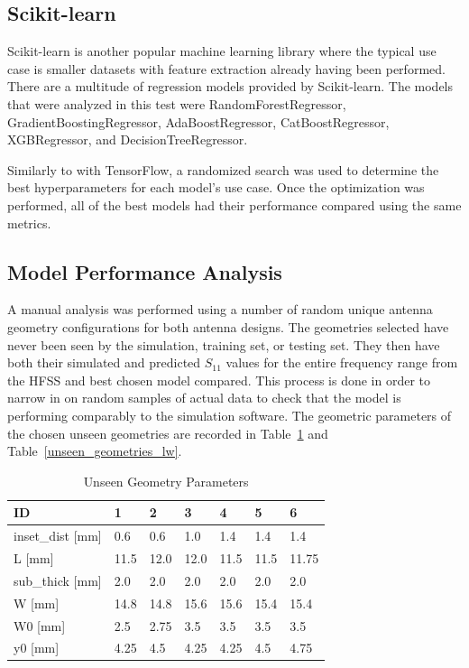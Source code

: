 \documentclass[conference]{IEEEtran}
\begin{document}
\subsection{Scikit-learn}
Scikit-learn is another popular machine learning library where the typical use case is smaller datasets with feature extraction already having been performed. There are a multitude of regression models provided by Scikit-learn. The models that were analyzed in this test were RandomForestRegressor, GradientBoostingRegressor, AdaBoostRegressor, CatBoostRegressor, XGBRegressor, and DecisionTreeRegressor.

Similarly to with TensorFlow, a randomized search was used to determine the best hyperparameters for each model's use case. Once the optimization was performed, all of the best models had their performance compared using the same metrics. 

\subsection{Model Performance Analysis}
A manual analysis was performed using a number of random unique antenna geometry configurations for both antenna designs. The geometries selected have never been seen by the simulation, training set, or testing set. They then have both their simulated and predicted $S_{11}$ values for the entire frequency range from the HFSS and best chosen model compared. This process is done in order to narrow in on random samples of actual data to check that the model is performing comparably to the simulation software. The geometric parameters of the chosen unseen geometries are recorded in Table~\ref{unseen_geometries_p} and Table~\ref{unseen_geometries_lw}.

\begin{table}[h]
\caption{Unseen Geometry Parameters}
\begin{center}
\begin{tabular}{ |l|l|l|l|l|l|l| }
    \hline
    ID & 1 & 2 & 3 & 4 & 5 & 6 \\ 
    \hline
    inset\_dist [mm] & 0.6 & 0.6 & 1.0 & 1.4 & 1.4 & 1.4 \\
    \hline
    L [mm] & 11.5 & 12.0 & 12.0 & 11.5 & 11.5 & 11.75 \\
    \hline
    sub\_thick [mm]  & 2.0 & 2.0 & 2.0 & 2.0 & 2.0 & 2.0 \\
    \hline
    W [mm]  & 14.8 & 14.8 & 15.6 & 15.6 & 15.4 & 15.4 \\
    \hline
    W0 [mm] & 2.5 & 2.75 & 3.5 & 3.5 & 3.5 & 3.5 \\
    \hline
    y0 [mm] & 4.25 & 4.5 & 4.25 & 4.25 & 4.5 & 4.75 \\
    \hline
\end{tabular}
\end{center}
\label{unseen_geometries_p}
\end{table}    
\end{document}
